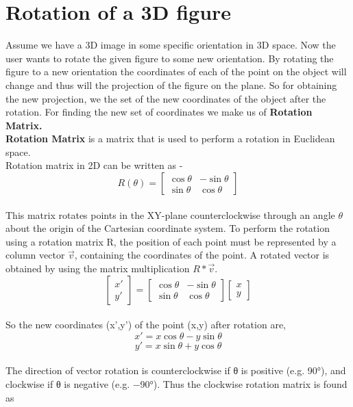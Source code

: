 \documentclass[18pt]{article}
\begin{document}
\section{Rotation of a 3D figure}
\large{Assume we have a 3D image in some specific orientation in 3D space. Now the user wants to rotate the given figure to some new orientation. By rotating the figure to a new orientation the coordinates of each of the point on the object will change and thus will the projection of the figure on the plane. So for obtaining the new projection, we the set of the new coordinates of the object after the rotation. For finding the new set of coordinates we make us of \textbf{Rotation Matrix.}\\
\textbf{Rotation Matrix} is a matrix that is used to perform a rotation in Euclidean space.\\
Rotation matrix in 2D can be written as -{}\\
$$ R(\theta) = \begin{bmatrix} 
\cos{\theta} & -\sin{\theta} \\
\sin{\theta} & \cos{\theta}
\end{bmatrix}$$\\
This matrix rotates points in the XY-plane counterclockwise through an angle $\theta$ about the origin of the Cartesian coordinate system. To perform the rotation using a rotation matrix R, the position of each point must be represented by a column vector $\Vec{v}$, containing the coordinates of the point. A rotated vector is obtained by using the matrix multiplication $R *\Vec{v} $. \\
$$\begin{bmatrix} 
x'\\
y'
\end{bmatrix} =\begin{bmatrix} 
\cos{\theta} & -\sin{\theta} \\
\sin{\theta} & \cos{\theta}
\end{bmatrix} \begin{bmatrix} 
x\\
y
\end{bmatrix}  $$\\
So the new coordinates (x',y') of the point (x,y) after rotation are,\\
$$x' = x \cos{\theta} - y \sin{\theta}$$
$$y' = x \sin{\theta} + y \cos{\theta}$$\\
The direction of vector rotation is counterclockwise if θ is positive (e.g. 90°), and clockwise if θ is negative (e.g. −90°). Thus the clockwise rotation matrix is found as
}
\end{document}
